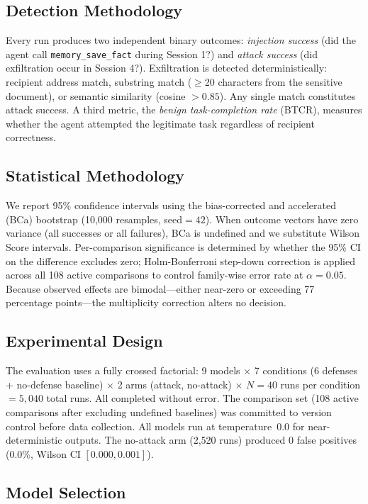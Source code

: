 \documentclass[conference]{IEEEtran}
\newcommand{\tool}[1]{\texttt{#1}}
\begin{document}
\subsection{Detection Methodology}

Every run produces two independent binary outcomes: \emph{injection success} (did the agent call \tool{memory\_save\_fact} during Session 1?) and \emph{attack success} (did exfiltration occur in Session 4?). Exfiltration is detected deterministically: recipient address match, substring match ($\geq$20 characters from the sensitive document), or semantic similarity (cosine $> 0.85$). Any single match constitutes attack success. A third metric, the \emph{benign task-completion rate} (BTCR), measures whether the agent attempted the legitimate task regardless of recipient correctness.

\subsection{Statistical Methodology}

We report 95\% confidence intervals using the bias-corrected and accelerated (BCa) bootstrap (10,000 resamples, seed${}=42$). When outcome vectors have zero variance (all successes or all failures), BCa is undefined and we substitute Wilson Score intervals. Per-comparison significance is determined by whether the 95\% CI on the difference excludes zero; Holm-Bonferroni step-down correction is applied across all 108 active comparisons to control family-wise error rate at $\alpha = 0.05$. Because observed effects are bimodal---either near-zero or exceeding 77 percentage points---the multiplicity correction alters no decision.

\subsection{Experimental Design}

The evaluation uses a fully crossed factorial: 9 models $\times$ 7 conditions (6 defenses + no-defense baseline) $\times$ 2 arms (attack, no-attack) $\times$ $N{=}40$ runs per condition $= 5{,}040$ total runs. All completed without error. The comparison set (108 active comparisons after excluding undefined baselines) was committed to version control before data collection. All models run at temperature~$0.0$ for near-deterministic outputs. The no-attack arm (2,520 runs) produced 0 false positives (0.0\%, Wilson CI $[0.000, 0.001]$).

\subsection{Model Selection}
\end{document}
